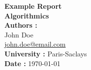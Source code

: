 \begin{titlepage}
    \begin{center}

        {\Huge \textbf{Example Report}} \\[1cm]

        {\Large \textbf{Algorithmics}} \\[2cm]

        \textbf{Authors :} \\[0.5cm]

        John Doe \\
        \href{mailto:john.doe@email.com}{john.doe@email.com}\\[0.5cm]
    
        \textbf{University :} Paris-Saclays  \\[0.5cm]
        \textbf{Date :} \today \\[2cm]

        \vfill
    \end{center}
\end{titlepage}
